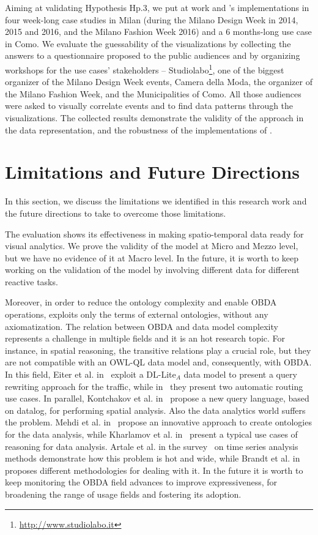 Aiming at validating Hypothesis \textsf{Hp.3}, we put at work \frappe{} and \river{}'s implementations in four week-long case studies in Milan (during the Milano Design Week in 2014, 2015 and 2016, and the Milano Fashion Week 2016) and a 6 months-long use case in Como.
We evaluate the guessability of the visualizations by collecting the answers to a questionnaire proposed to the public audiences and by organizing workshops for the use cases' stakeholders -- Studiolabo\footnote{\url{http://www.studiolabo.it}}, one of the biggest organizer of the Milano Design Week events, Camera della Moda, the organizer of the Milano Fashion Week, and the Municipalities of Como.
All those audiences were asked to visually correlate events and to find data patterns through the visualizations.
The collected results demonstrate the validity of the \frappe{} approach in the data representation, and the robustness of the implementations of \river{}.

\section{Limitations and Future Directions}
In this section, we discuss the limitations we identified in this research work and the future directions to take to overcome those limitations.

The \frappe{} evaluation shows its effectiveness in making spatio-temporal data ready for visual analytics.
We prove the validity of the model at Micro and Mezzo level, but we have no evidence of it at Macro level.
In the future, it is worth to keep working on the validation of the model by involving different data for different reactive tasks.

Moreover, in order to reduce the ontology complexity and enable OBDA operations, \frappe{} exploits only the terms of external ontologies, without any axiomatization.
The relation between OBDA and data model complexity represents a challenge in multiple fields and it is an hot research topic.
For instance, in spatial reasoning, the transitive relations play a crucial role, but they are not compatible with an OWL-QL data model and, consequently, with OBDA.
In this field, Eiter et al. in~\cite{DBLP:conf/esws/EiterPS17} exploit a DL-Lite$_A$ data model to present a query rewriting approach for the traffic, while in~\cite{DBLP:journals/itsr/EiterKPRSS16} they present two automatic routing use cases. In parallel, Kontchakov et al. in~\cite{DBLP:conf/ijcai/KontchakovPPRZ16} propose a new query language, based on datalog, for performing spatial analysis.
Also the data analytics world suffers the problem. Mehdi et al. in~\cite{DBLP:conf/ijcai/MehdiBRR16} propose an innovative approach to create ontologies for the data analysis, while Kharlamov et al. in~\cite{DBLP:journals/ws/KharlamovMMNORS17} present a typical use cases of reasoning for data analysis.
Artale et al. in the survey~\cite{DBLP:conf/dlog/BienvenuKKPZ16} on time series analysis methods demonstrate how this problem is hot and wide, while Brandt et al. in ~\cite{DBLP:conf/aaai/BrandtKKRXZ17} proposes different methodologies for dealing with it.
In the future it is worth to keep monitoring the OBDA field advances to improve \frappe{} expressiveness, for broadening the range of usage fields and fostering its adoption.

